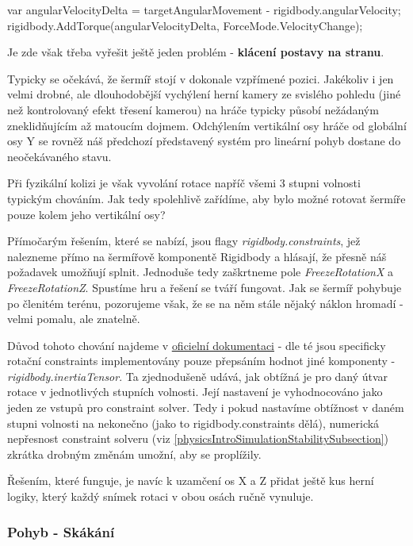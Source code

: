 \begin{code}
 var angularVelocityDelta = 
     targetAngularMovement - rigidbody.angularVelocity;
 rigidbody.AddTorque(angularVelocityDelta, ForceMode.VelocityChange);
\end{code}

Je zde však třeba vyřešit ještě jeden problém - \textbf{klácení postavy na stranu}. 

Typicky se očekává, že šermíř stojí v dokonale vzpřímené pozici. Jakékoliv i jen velmi drobné, ale dlouhodobější vychýlení herní kamery ze svislého pohledu (jiné než kontrolovaný efekt třesení kamerou) na hráče typicky působí nežádaným zneklidňujícím až matoucím dojmem. Odchýlením vertikální osy hráče od globální osy Y se rovněž náš předchozí představený systém pro lineární pohyb dostane do neočekávaného stavu. 

Při fyzikální kolizi je však vyvolání rotace napříč všemi 3 stupni volnosti typickým chováním. Jak tedy spolehlivě zařídíme, aby bylo možné rotovat šermíře pouze kolem jeho vertikální osy?

Přímočarým řešením, které se nabízí, jsou flagy \textit{rigidbody.constraints}, jež nalezneme přímo na šermířově komponentě Rigidbody a hlásají, že přesně náš požadavek umožňují splnit. Jednoduše tedy zaškrtneme pole \textit{FreezeRotationX} a \textit{FreezeRotationZ}. Spustíme hru a řešení se tváří fungovat. Jak se šermíř pohybuje po členitém terénu, pozorujeme však, že se na něm stále nějaký náklon hromadí - velmi pomalu, ale znatelně.

Důvod tohoto chování najdeme v \href{https://docs.unity3d.com/2022.2/Documentation/ScriptReference/Rigidbody-inertiaTensor.html}{\underline{oficielní dokumentaci}} \cite{Unity} - dle té jsou specificky rotační constraints implementovány pouze přepsáním hodnot jiné komponenty - \textit{rigidbody.inertiaTensor}. Ta zjednodušeně udává, jak obtížná je pro daný útvar rotace v jednotlivých stupních volnosti. Její nastavení je vyhodnocováno jako jeden ze vstupů pro constraint solver. Tedy i pokud nastavíme obtížnost v daném stupni volnosti na nekonečno (jako to rigidbody.constraints dělá), numerická nepřesnost constraint solveru (viz \ref{physicsIntroSimulationStabilitySubsection}) zkrátka drobným změnám umožní, aby se proplížily.

Řešením, které funguje, je navíc k uzamčení os X a Z přidat ještě kus herní logiky, který každý snímek rotaci v obou osách ručně vynuluje.

\subsubsection*{Pohyb - Skákání}

